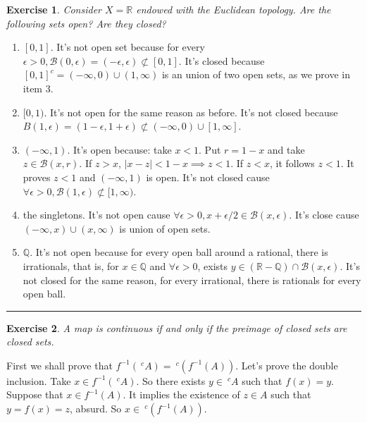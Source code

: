 \documentclass[a4paper,11pt]{article}
\newcommand{\linia}{\rule{\linewidth}{0.5pt}}
\theoremstyle{mytheor}
\theoremstyle{mytheor}
\newtheorem{exercise}{Exercise}
\theoremstyle{remark}
\newcommand{\B}{\mathcal{B}}
\newcommand{\R}{\mathbb{R}}
\begin{document}
\begin{exercise}
    Consider $X = \R$ endowed with the Euclidean topology. Are the following
sets open? Are they closed?
\end{exercise}
\begin{enumerate}
    \item $[0,1]$. It's not open set because for every $\epsilon > 0, \B(0,
    \epsilon) = (-\epsilon, \epsilon) \not \subset [0,1]$. It's closed because
    $[0,1]^c = (-\infty, 0) \cup (1, \infty)$ is an union of two open sets, as
   we prove in item 3.  

    \item $[0,1)$. It's not open for the same reason as before. It's not
    closed because $B(1,\epsilon) = (1 - \epsilon, 1 + \epsilon) \not\subset
    (-\infty, 0) \cup [1, \infty]$. 

    \item $(-\infty,1)$. It's open because: take $x < 1$. Put $r = 1 - x$ and
    take $z \in \B(x, r)$. If $z > x$, $|x - z| < 1 - x \implies z < 1$. If $z
    < x$, it follows $z < 1$. It proves $z < 1$ and $(-\infty, 1)$ is open.
    It's not closed cause $\forall \epsilon > 0, \B(1,\epsilon) \not \subset
    [1, \infty)$. 
    
    \item the singletons. It's not open cause $\forall \epsilon > 0, x +
    \epsilon/2 \in \B(x,\epsilon)$. It's close cause $(-\infty,
    x)\cup(x,\infty)$ is union of open sets. 
    
    \item $\mathbb{Q}$. It's not open because for every open ball around a
    rational, there is irrationals, that is, for $x \in \mathbb{Q}$ and
    $\forall \epsilon > 0$, exists $y \in (\R - \mathbb{Q}) \cap
    \B(x,\epsilon)$. It's not closed for the same reason, for every
    irrational, there is rationals for every open ball. 
\end{enumerate}

\noindent\linia

\begin{exercise}
    A map is continuous if and only if the preimage of closed sets are closed sets.
\end{exercise}

First we shall prove that $f^{-1}(~^cA) = ~^c(f^{-1}(A))$. Let's prove the
double inclusion. Take $x \in f^{-1}(~^cA)$. So there exists $y \in ~^cA$ such
that $f(x) = y$. Suppose that $x \in f^{-1}(A)$. It implies the existence of
$z \in A$ such that $y = f(x) = z$, absurd. So $x \in ~^c(f^{-1}(A))$.
\end{document}
